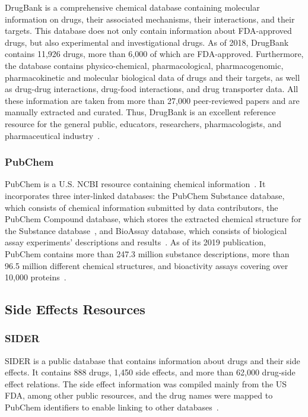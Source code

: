 DrugBank is a comprehensive chemical database containing molecular information on drugs, their associated mechanisms, their interactions, and their targets.
This database does not only contain information about \ac{FDA}-approved drugs, but also experimental and investigational drugs.
As of 2018, DrugBank contains 11,926 drugs, more than 6,000 of which are \ac{FDA}-approved.
Furthermore, the database contains physico-chemical, pharmacological, pharmacogenomic, pharmacokinetic and molecular biological data of drugs and their targets, as well as drug-drug interactions, drug-food interactions, and drug transporter data.
All these information are taken from more than 27,000 peer-reviewed papers and are manually extracted and curated.
Thus, DrugBank is an excellent reference resource for the general public, educators, researchers, pharmacologists, and pharmaceutical industry~\cite{wishart_drugbank_2018}.

\subsubsection{PubChem}

PubChem is a U.S. \ac{NCBI} resource containing chemical information~\cite{kim_pubchem_2019}.
It incorporates three inter-linked databases: the PubChem Substance database, which consists of chemical information submitted by data contributors, the PubChem Compound database, which stores the extracted chemical structure for the Substance database~\cite{kim_pubchem_2016}, and BioAssay database, which consists of biological assay experiments’ descriptions and results~\cite{kim_pubchem_2019}.
As of its 2019 publication, PubChem contains more than 247.3 million substance descriptions, more than 96.5 million different chemical structures, and bioactivity assays covering over 10,000 proteins~\cite{kim_pubchem_2019}.

\subsection{Side Effects Resources}

\subsubsection{SIDER}

\ac{SIDER} is a public database that contains information about drugs and their side effects.
It contains 888 drugs, 1,450 side effects, and more than 62,000 drug-side effect relations.
The side effect information was compiled mainly from the US \ac{FDA}, among other public resources, and the drug names were mapped to PubChem identifiers to enable linking to other databases~\cite{kuhn_side_2010}.


